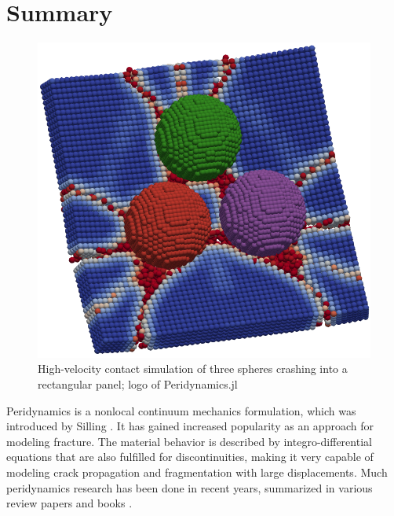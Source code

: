 \documentclass{juliacon}
\begin{document}


\maketitle

\section{Summary}

\begin{figure}
\centerline{\includegraphics[width=0.8\linewidth]{logo.png}}
\caption{High-velocity contact simulation of three spheres crashing into a rectangular panel; logo of Peridynamics.jl}
\label{fig:logo}
\end{figure}

Peridynamics is a nonlocal continuum mechanics formulation, which was introduced by Silling \cite{Silling2000}.
It has gained increased popularity as an approach for modeling fracture.
The material behavior is described by integro-differential equations that are also fulfilled for discontinuities, making it very capable of modeling crack propagation and fragmentation with large displacements.
Much peridynamics research has been done in recent years, summarized in various review papers and books \cite{Diehl2019,Javili2019Review,Madenci2014}.
\end{document}
